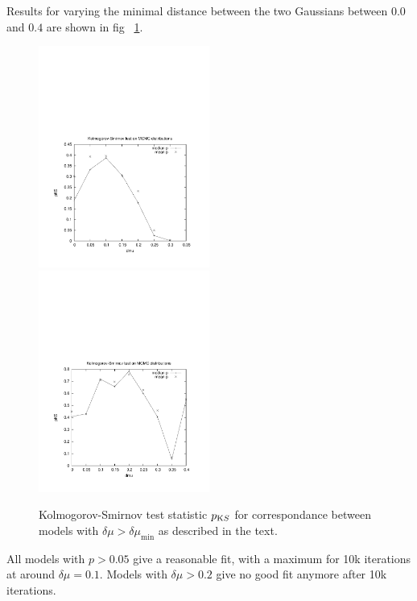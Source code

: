 Results for varying the minimal distance between the two Gaussians
between $0.0$ and $0.4$ are shown in fig ~\ref{fig:kit}.

\begin{figure}
    \begin{center}
        \hspace{-7mm}
        \includegraphics[width=0.5\textwidth]{fig/10kit.pdf}
        \includegraphics[width=0.5\textwidth]{fig/50kit.pdf}
        \caption{Kolmogorov-Smirnov test statistic $p_{\text KS}$ for
          correspondance between models with $\delta\mu>\delta\mu_{\min}$ as
          described in the text.}
        \label{fig:kit}
    \end{center}
\end{figure}


All models with $p>0.05$ give a reasonable fit, with a maximum for 10k
iterations at around $\delta \mu = 0.1$. Models with $\delta \mu>0.2$
give no good fit anymore after 10k iterations.

